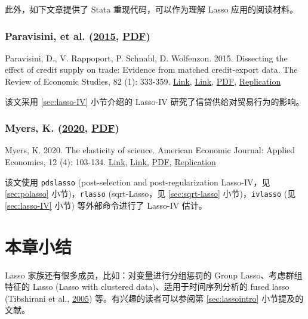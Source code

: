 {\vspace{6pt}

此外，如下文章提供了 Stata 重现代码，可以作为理解 Lasso 应用的阅读材料。

\subsubsection{Paravisini, et al. (\href{https://doi.org/10.1093/restud/rdu028}{2015}, \href{http://sci-hub.ren/10.1093/restud/rdu028}{PDF})}

Paravisini, D., V. Rappoport, P. Schnabl, D. Wolfenzon. 2015. Dissecting the effect of credit supply on trade: Evidence from matched credit-export data. The Review of Economic Studies, 82 (1): 333-359. \href{https://doi.org/10.1093/restud/rdu028}{Link}, \href{https://doi.org/10.1093/restud/rdu028}{Link}, \href{http://sci-hub.ren/10.1093/restud/rdu028}{PDF}, \href{https://academic.oup.com/restud/article/82/1/333/1545669}{Replication}

该文采用 \ref{sec:lasso-IV} 小节介绍的 Lasso-IV 研究了信贷供给对贸易行为的影响。  

\subsubsection{Myers, K. (\href{https://doi.org/10.1257/app.20180518}{2020}, \href{http://sci-hub.ren/10.1257/app.20180518}{PDF})}

Myers, K. 2020. The elasticity of science. American Economic Journal: Applied Economics, 12 (4): 103-134. \href{https://doi.org/10.1257/app.20180518}{Link}, \href{https://www.aeaweb.org/articles?id=10.1257/app.20180518}{Link}, \href{http://sci-hub.ren/10.1257/app.20180518}{PDF}, \href{https://www.aeaweb.org/doi/10.1257/app.20180518.data}{Replication}

该文使用 \texttt{pdslasso} (post-selection and post-regularization Lasso-IV，见 \ref{sec:polasso} 小节)，\texttt{rlasso} (sqrt-Lasso，见 \ref{sec:sqrt-lasso} 小节)，\texttt{ivlasso} (见 \ref{sec:lasso-IV} 小节) 等外部命令进行了 Lasso-IV 估计。
  


\section{本章小结}

Lasso 家族还有很多成员，比如：对变量进行分组惩罚的 Group Lasso、考虑群组特征的 Lasso (Lasso with clustered data)、适用于时间序列分析的 fused lasso (Tibshirani et al., \href{http://sci-hub.ren/10.1111/J.1467-9868.2005.00490.X}{2005}) 等。有兴趣的读者可以参阅第 \ref{sec:lassointro} 小节提及的文献。

}
